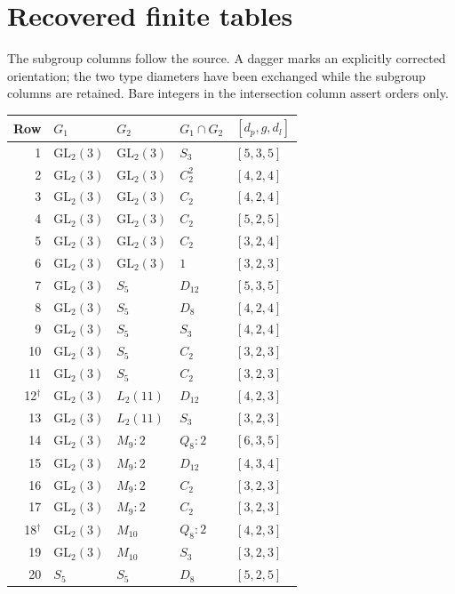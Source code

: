 \clearpage
\section{Recovered finite tables}
The subgroup columns follow the source. A dagger marks an explicitly corrected
orientation; the two type diameters have been exchanged while the subgroup
columns are retained. Bare integers in the intersection column assert orders only.
\begin{center}\small
\begin{tabular}{rllll}
\toprule
Row & $G_1$ & $G_2$ & $G_1\cap G_2$ & $[d_p,g,d_l]$\\
\midrule
1 & $\mathrm{GL}_2(3)$ & $\mathrm{GL}_2(3)$ & $S_3$ & $[5,3,5]$\\
2 & $\mathrm{GL}_2(3)$ & $\mathrm{GL}_2(3)$ & $C_2^2$ & $[4,2,4]$\\
3 & $\mathrm{GL}_2(3)$ & $\mathrm{GL}_2(3)$ & $C_2$ & $[4,2,4]$\\
4 & $\mathrm{GL}_2(3)$ & $\mathrm{GL}_2(3)$ & $C_2$ & $[5,2,5]$\\
5 & $\mathrm{GL}_2(3)$ & $\mathrm{GL}_2(3)$ & $C_2$ & $[3,2,4]$\\
6 & $\mathrm{GL}_2(3)$ & $\mathrm{GL}_2(3)$ & $1$ & $[3,2,3]$\\
7 & $\mathrm{GL}_2(3)$ & $S_5$ & $D_{12}$ & $[5,3,5]$\\
8 & $\mathrm{GL}_2(3)$ & $S_5$ & $D_8$ & $[4,2,4]$\\
9 & $\mathrm{GL}_2(3)$ & $S_5$ & $S_3$ & $[4,2,4]$\\
10 & $\mathrm{GL}_2(3)$ & $S_5$ & $C_2$ & $[3,2,3]$\\
11 & $\mathrm{GL}_2(3)$ & $S_5$ & $C_2$ & $[3,2,3]$\\
12$^\dagger$ & $\mathrm{GL}_2(3)$ & $L_2(11)$ & $D_{12}$ & $[4,2,3]$\\
13 & $\mathrm{GL}_2(3)$ & $L_2(11)$ & $S_3$ & $[3,2,3]$\\
14 & $\mathrm{GL}_2(3)$ & $M_9:2$ & $Q_8:2$ & $[6,3,5]$\\
15 & $\mathrm{GL}_2(3)$ & $M_9:2$ & $D_{12}$ & $[4,3,4]$\\
16 & $\mathrm{GL}_2(3)$ & $M_9:2$ & $C_2$ & $[3,2,3]$\\
17 & $\mathrm{GL}_2(3)$ & $M_9:2$ & $C_2$ & $[3,2,3]$\\
18$^\dagger$ & $\mathrm{GL}_2(3)$ & $M_{10}$ & $Q_8:2$ & $[4,2,3]$\\
19 & $\mathrm{GL}_2(3)$ & $M_{10}$ & $S_3$ & $[3,2,3]$\\
20 & $S_5$ & $S_5$ & $D_8$ & $[5,2,5]$\\

\end{tabular}
\end{center}

